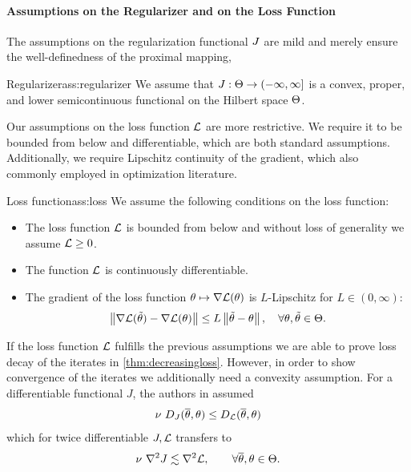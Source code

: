 \paragraph{Assumptions on the Regularizer and on the Loss Function}
%
The assumptions on the regularization functional $J$ are mild and merely ensure the well-definedness of the proximal mapping,
%
%
\begin{assumption}{Regularizer}{ass:regularizer}
	We assume that $J:\Theta\to(-\infty,\infty]$ is a convex, proper, and lower semicontinuous functional on the Hilbert space $\Theta$.
\end{assumption}
%
%
Our assumptions on the loss function $\mathcal{L}$ are more restrictive. We require it to be bounded from below and differentiable, which are both standard assumptions. Additionally, we require Lipschitz continuity of the gradient, which also commonly employed in optimization literature.
%
\begin{assumption}{Loss function}{ass:loss}
	We assume the following conditions on the loss function:
	\begin{itemize}
		\item The loss function $\mathcal{L}$ is bounded from below and without loss of generality we assume $\mathcal{L}\geq 0$.
		\item The function $\mathcal{L}$ is continuously differentiable.
		\item The gradient of the loss function $\theta\mapsto\nabla\mathcal{L}(\theta)$ is $L$-Lipschitz for $L\in(0,\infty)$:
		\begin{align}\label{ineq:gradLip}
			\left\|\nabla\mathcal{L}(\tilde{\theta})-\nabla\mathcal{L}(\theta)\right\|\leq L \left\|\tilde{\theta}-\theta\right\|,\quad \forall \theta,\tilde{\theta}\in\Theta.
		\end{align}
	\end{itemize}
\end{assumption}
%
%
If the loss function $\mathcal{L}$ fulfills the previous assumptions we are able to prove loss decay of the iterates in \cref{thm:decreasingloss}. However, in order to show convergence of the iterates we additionally need a convexity assumption. For a differentiable functional $J$, the authors in \cite{dragomir2021fast} assumed
%
\begin{align*}
	\nu\ D_J(\overline\theta,\theta) \leq D_{\mathcal{L}}(\overline\theta,\theta)
\end{align*}
%
which for twice differentiable $J,\mathcal{L}$ transfers to
%
\begin{align*}
	\nu\ \nabla^2 J \lesssim \nabla^2 \mathcal{L},\qquad\forall\overline\theta,\theta\in\Theta.
\end{align*}
